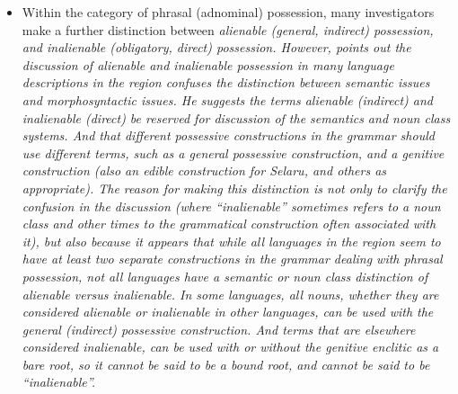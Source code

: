 \begin{itemize}
				the “genitive” marker is indexed on the  (\it{fafu olo-} ‘pig head-’).
				While the marking is on different constituents,
				nevertheless the semantic relationship is exactly the same as
				in ‘\it{pig’s head}’ or ‘\it{head of pig}’.
				Furthermore, Indo-European languages tend to be predominantly
				dependent-marking, whereas the Austronesian languages in our target region tend
				to be predominantly head-marking,
				and consequently the genitive marking indexed on the 
				(dependent) in Indo-European languages,
				but on the  (head) in Austronesian languages in
				the region is entirely consistent with that distinction (see
				\citealp{Nichols1986,NicholsBickel2013}).
				Some investigators find the terms “genitive”
				and “possessive” useful for distinguishing two different grammatical
				constructions of phrasal possession (see below).
	\item Within the category of phrasal (adnominal) possession,
				many investigators make a further distinction between \it{alienable}
				(general, indirect) possession, and \it{inalienable} (obligatory, direct) possession.
				However, \citet{GrimesCIP} points out the discussion of \it{alienable}
				and \it{inalienable} possession in many language descriptions
				in the region confuses the distinction between semantic issues and morphosyntactic issues.
				He suggests the terms \it{alienable} (indirect)
				and \it{inalienable} (direct) be reserved for discussion of the
				semantics and noun class systems.
				And that different possessive constructions in the grammar should
				use different terms, such as a general \it{possessive} construction,
				and a \it{genitive} construction (also an \it{edible} construction
				for Selaru, and others as appropriate).
				The reason for making this distinction is not only to clarify
				the confusion in the discussion (where “inalienable” sometimes
				refers to a noun class
				and other times to the grammatical construction often associated
				with it), but also because it appears that while all languages in the region
				seem to have at least two separate constructions in the grammar
				dealing with phrasal possession,
				not all languages have a semantic or noun class distinction of alienable versus inalienable.
				In some languages, \it{all} nouns,
				whether they are considered alienable or inalienable in other
				languages, can be used with the general (indirect) possessive construction.
				And terms that are elsewhere considered inalienable,
				can be used with or without the genitive enclitic as a bare root,
				so it cannot be said to be a bound root,
				and cannot be said to be “inalienable”.
\end{itemize}

